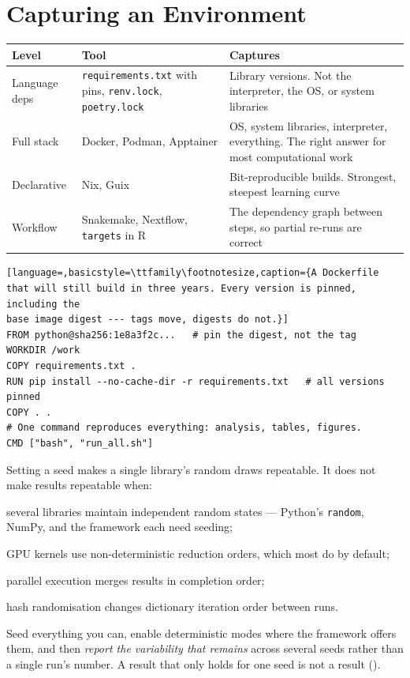 \section{Capturing an Environment}

\begin{center}
\small
\begin{tabular}{@{}L{2.4cm}L{4.0cm}L{7.7cm}@{}}
\toprule
\textbf{Level} & \textbf{Tool} & \textbf{Captures} \\
\midrule
Language deps & \texttt{requirements.txt} with pins, \texttt{renv.lock},
                \texttt{poetry.lock}
              & Library versions. Not the interpreter, the OS, or system
                libraries \\
Full stack    & Docker, Podman, Apptainer
              & OS, system libraries, interpreter, everything. The right answer
                for most computational work \\
Declarative   & Nix, Guix
              & Bit-reproducible builds. Strongest, steepest learning curve \\
Workflow      & Snakemake, Nextflow, \texttt{targets} in R
              & The dependency graph between steps, so partial re-runs are
                correct \\
\bottomrule
\end{tabular}
\end{center}

\begin{lstlisting}[language=,basicstyle=\ttfamily\footnotesize,caption={A Dockerfile
that will still build in three years. Every version is pinned, including the
base image digest --- tags move, digests do not.}]
FROM python@sha256:1e8a3f2c...   # pin the digest, not the tag
WORKDIR /work
COPY requirements.txt .
RUN pip install --no-cache-dir -r requirements.txt   # all versions pinned
COPY . .
# One command reproduces everything: analysis, tables, figures.
CMD ["bash", "run_all.sh"]
\end{lstlisting}

\begin{pitfall}
Setting a seed makes a single library's random draws repeatable. It does not
make results repeatable when:

\begin{tight}
  \item several libraries maintain independent random states --- Python's
    \texttt{random}, NumPy, and the framework each need seeding;
  \item GPU kernels use non-deterministic reduction orders, which most do by
    default;
  \item parallel execution merges results in completion order;
  \item hash randomisation changes dictionary iteration order between runs.
\end{tight}

\medskip
Seed everything you can, enable deterministic modes where the framework offers
them, and then \emph{report the variability that remains} across several seeds
rather than a single run's number. A result that only holds for one seed is not
a result ().
\end{pitfall}

